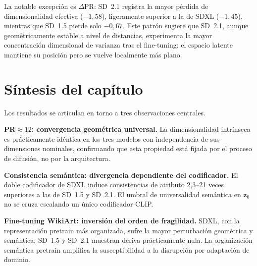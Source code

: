 \documentclass[12pt, a4paper, twoside]{book}
\newcommand{\z}{\mathbf{z}}
\begin{document}
La notable excepción es $\Delta\text{PR}$: SD~2.1 registra la mayor pérdida de dimensionalidad
efectiva ($-1{,}58$), ligeramente superior a la de SDXL ($-1{,}45$), mientras que SD~1.5
pierde solo $-0{,}67$. Este patrón sugiere que SD~2.1, aunque geométricamente estable a nivel
de distancias, experimenta la mayor concentración dimensional de varianza tras el fine-tuning:
el espacio latente mantiene su posición pero se vuelve localmente más plano.

\section*{Síntesis del capítulo}

\noindent
Los resultados se articulan en torno a tres observaciones centrales.

\medskip
\noindent\textbf{PR$\approx 12$: convergencia geométrica universal.}
La dimensionalidad intrínseca es prácticamente idéntica en los tres modelos con independencia
de sus dimensiones nominales, confirmando que esta propiedad está fijada por el proceso de
difusión, no por la arquitectura.

\medskip
\noindent\textbf{Consistencia semántica: divergencia dependiente del codificador.}
El doble codificador de SDXL induce consistencias de atributo 2,3--21 veces superiores a las
de SD~1.5 y SD~2.1. El umbral de universalidad semántica en $\z_0$ no se cruza escalando un
único codificador CLIP.

\medskip
\noindent\textbf{Fine-tuning WikiArt: inversión del orden de fragilidad.}
SDXL, con la representación pretrain más organizada, sufre la mayor perturbación geométrica
y semántica; SD~1.5 y SD~2.1 muestran deriva prácticamente nula. La organización semántica
pretrain amplifica la susceptibilidad a la disrupción por adaptación de dominio.


\end{document}
